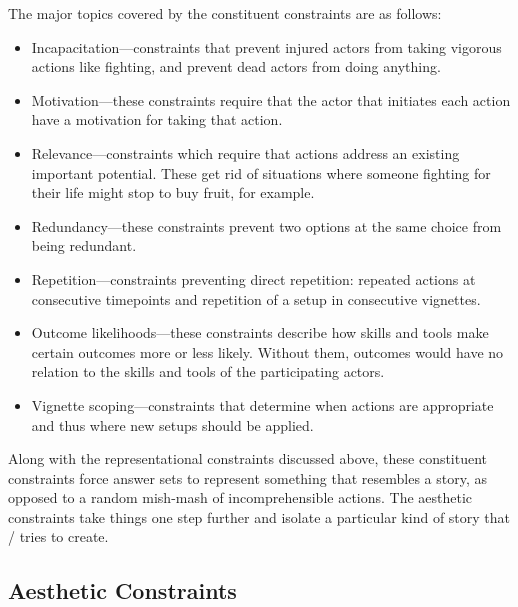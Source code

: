 The major topics covered by the constituent constraints are as follows:
%
\begin{itemize}
  \item Incapacitation---constraints that prevent injured actors from taking vigorous actions like fighting, and prevent dead actors from doing anything.
  \item Motivation---these constraints require that the actor that initiates each action have a motivation for taking that action.
  \item Relevance---constraints which require that actions address an existing important potential. These get rid of situations where someone fighting for their life might stop to buy fruit, for example.
  \item Redundancy---these constraints prevent two options at the same choice from being redundant.
  \item Repetition---constraints preventing direct repetition: repeated actions at consecutive timepoints and repetition of a setup in consecutive vignettes.
  \item Outcome likelihoods---these constraints describe how skills and tools make certain outcomes more or less likely. Without them, outcomes would have no relation to the skills and tools of the participating actors.
  \item Vignette scoping---constraints that determine when  actions are appropriate and thus where new setups should be applied.
\end{itemize}
%
Along with the representational constraints discussed above, these constituent constraints force answer sets to represent something that resembles a story, as opposed to a random mish-mash of incomprehensible actions.
%
The aesthetic constraints take things one step further and isolate a particular kind of story that \dunyazad/ tries to create.

\subsection{Aesthetic Constraints}


